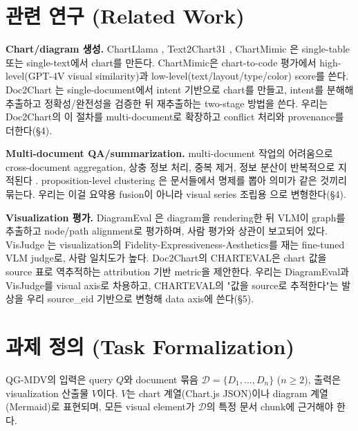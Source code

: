 \documentclass[11pt]{article}
\begin{document}
\section{관련 연구 (Related Work)}

\textbf{Chart/diagram 생성.} ChartLlama \cite{han2023chartllama}, Text2Chart31
\cite{zadeh2024text2chart31}, ChartMimic \cite{yang2024chartmimic}은 single-table 또는
single-text에서 chart를 만든다. ChartMimic은 chart-to-code 평가에서 high-level(GPT-4V visual
similarity)과 low-level(text/layout/type/color) score를 쓴다. Doc2Chart \cite{jain2025doc2chart}
는 single-document에서 intent 기반으로 chart를 만들고, intent를 분해해 추출하고 정확성/완전성을
검증한 뒤 재추출하는 two-stage 방법을 쓴다. 우리는 Doc2Chart의 이 절차를 multi-document로
확장하고 conflict 처리와 provenance를 더한다(§4).

\textbf{Multi-document QA/summarization.} multi-document 작업의 어려움으로 cross-document
aggregation, 상충 정보 처리, 중복 제거, 정보 분산이 반복적으로 지적된다 \cite{ernst2022proposition,
tang2024multihoprag}. proposition-level clustering \cite{ernst2022proposition}은 문서들에서
명제를 뽑아 의미가 같은 것끼리 묶는다. 우리는 이걸 요약용 fusion이 아니라 visual series 조립용
으로 변형한다(§4).

\textbf{Visualization 평가.} DiagramEval \cite{liang2025diagrameval}은 diagram을 rendering한
뒤 VLM이 graph를 추출하고 node/path alignment로 평가하며, 사람 평가와 상관이 보고되어 있다.
VisJudge \cite{xie2025visjudge}는 visualization의 Fidelity-Expressiveness-Aesthetics를 재는
fine-tuned VLM judge로, 사람 일치도가 높다. Doc2Chart의 CHARTEVAL은 chart 값을 source 표로
역추적하는 attribution 기반 metric을 제안한다. 우리는 DiagramEval과 VisJudge를 visual axis로
차용하고, CHARTEVAL의 "값을 source로 추적한다"는 발상을 우리 source\_eid 기반으로 변형해
data axis에 쓴다(§5).

\section{과제 정의 (Task Formalization)}

QG-MDV의 입력은 query $Q$와 document 묶음 $\mathcal{D}=\{D_1,\dots,D_n\}$ ($n\geq 2$),
출력은 visualization 산출물 $V$이다. $V$는 chart 계열(Chart.js JSON)이나 diagram 계열
(Mermaid)로 표현되며, 모든 visual element가 $\mathcal{D}$의 특정 문서 chunk에 근거해야 한다.
\end{document}
